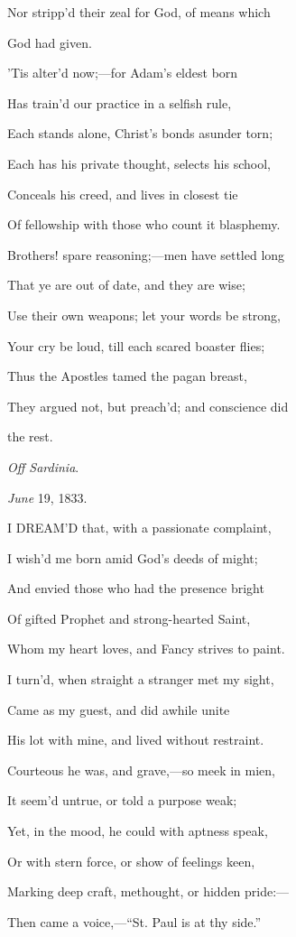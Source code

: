 Nor stripp'd their zeal for God, of means which

God had given.

'Tis alter'd now;—for Adam's eldest born

Has train'd our practice in a
selfish rule,

Each stands alone, Christ's bonds asunder
torn;

Each has his private thought,
selects his school,

Conceals his creed, and lives in closest tie

Of fellowship with those who count it blasphemy.

Brothers! spare reasoning;—men have settled long

That ye are out of date, and
they are wise;

Use their own weapons; let your words be strong,

Your cry be loud, till each
scared boaster flies;

Thus the Apostles tamed the pagan breast,

They argued not, but preach'd; and conscience did

the
rest.

\emph{Off Sardinia}.

\emph{June} 19, 1833.


I DREAM'D that, with a passionate complaint,

I wish'd me born amid God's deeds of might;

And envied those who had the presence bright

Of gifted Prophet and strong-hearted Saint,

Whom my heart loves, and Fancy strives to paint.

I turn'd, when straight a stranger met my sight,

Came as my guest, and did awhile unite

His lot with mine, and lived without restraint.

Courteous he was, and grave,—so meek in mien,

It seem'd untrue, or told a purpose weak;

Yet, in the mood, he could with aptness speak,

Or with stern force, or show of feelings keen,

Marking deep craft, methought, or hidden pride:—

Then came a voice,—``St. Paul is at thy side.''

